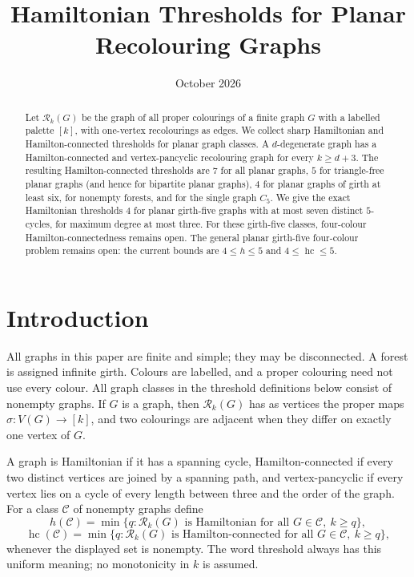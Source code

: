 \documentclass[11pt]{article}
\title{Hamiltonian Thresholds for Planar Recolouring Graphs}
\author{}
\date{October 2026}
\theoremstyle{remark}
\newcommand{\Rk}{\mathcal R_k}
\newcommand{\hc}{\operatorname{hc}}
\numberwithin{equation}{section}
\begin{document}
\maketitle

\begin{abstract}
Let $\Rk(G)$ be the graph of all proper colourings of a finite graph $G$ with a labelled palette $[k]$, with one-vertex recolourings as edges.  We collect sharp Hamiltonian and Hamilton-connected thresholds for planar graph classes.  A $d$-degenerate graph has a Hamilton-connected and vertex-pancyclic recolouring graph for every $k\ge d+3$.  The resulting Hamilton-connected thresholds are $7$ for all planar graphs, $5$ for triangle-free planar graphs (and hence for bipartite planar graphs), $4$ for planar graphs of girth at least six, for nonempty forests, and for the single graph $C_5$.  We give the exact Hamiltonian thresholds $4$ for planar girth-five graphs with at most seven distinct $5$-cycles, for maximum degree at most three.  For these girth-five classes, four-colour Hamilton-connectedness remains open.  The general planar girth-five four-colour problem remains open: the current bounds are $4\le h\le5$ and $4\le\hc\le5$.
\end{abstract}

\section{Introduction}

All graphs in this paper are finite and simple; they may be disconnected.  A forest is assigned infinite girth.  Colours are labelled, and a proper colouring need not use every colour. All graph classes in the threshold definitions below consist of nonempty graphs.  If $G$ is a graph, then $\Rk(G)$ has as vertices the proper maps $\sigma:V(G)\to[k]$, and two colourings are adjacent when they differ on exactly one vertex of $G$.

A graph is Hamiltonian if it has a spanning cycle, Hamilton-connected if every two distinct vertices are joined by a spanning path, and vertex-pancyclic if every vertex lies on a cycle of every length between three and the order of the graph.  For a class $\mathcal C$ of nonempty graphs define
\[
 h(\mathcal C)=\min\{q: \Rk(G)\text{ is Hamiltonian for all }G\in\mathcal C,\ k\ge q\},
\]
\[
 \hc(\mathcal C)=\min\{q: \Rk(G)\text{ is Hamilton-connected for all }G\in\mathcal C,\ k\ge q\},
\]
whenever the displayed set is nonempty.  The word threshold always has this uniform meaning; no monotonicity in $k$ is assumed.
\end{document}
